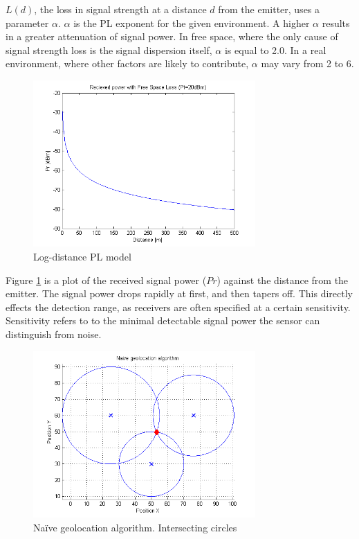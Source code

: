 \documentclass[10pt,a4paper]{book}
\begin{document}
$L(d)$, the loss in signal strength at a distance $d$ from the emitter, uses a parameter $\alpha$. $\alpha$ is the \gls{PL} exponent for the given environment. A higher $\alpha$ results in a greater attenuation of signal power. In free space, where the only cause of signal strength loss is the signal dispersion itself, $\alpha$ is equal to 2.0. In a real environment, where other factors are likely to contribute, $\alpha$ may vary from 2 to 6.

\begin{figure}[H]
\centering
\includegraphics[width=85mm]{Pathloss.png}
\caption{Log-distance \acrfull{PL} model}
\label{pathlossnonoisegraph}
\end{figure}

Figure \ref{pathlossnonoisegraph} is a plot of the received signal power ($Pr$) against the distance from the emitter. The signal power drops rapidly at first, and then tapers off. This directly effects the detection range, as receivers are often specified at a certain sensitivity. Sensitivity refers to to the minimal detectable signal power the sensor can distinguish from noise.


\begin{figure}[H]
\centering
\includegraphics[width=85mm]{Intersectingcircles.png}
\caption{Naïve geolocation algorithm. Intersecting circles}
\label{naivegeolocationalgorithm}
\end{figure}
\end{document}
